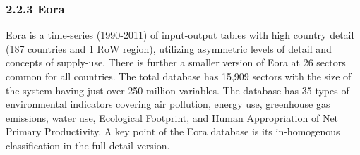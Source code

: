 \subsubsection{2.2.3 Eora}


Eora is a time-series (1990-2011) of input-output tables with high country detail (187 countries and 1 RoW region), utilizing asymmetric levels of detail and concepts of supply-use. There is further a smaller version of Eora at 26 sectors common for all countries. The total database has 15,909 sectors with the size of the system having just over 250 million variables. The database has 35 types of environmental indicators covering air pollution, energy use, greenhouse gas emissions, water use, Ecological Footprint, and Human Appropriation of Net Primary Productivity. A key point of the Eora database is its in-homogenous classification in the full detail version.
